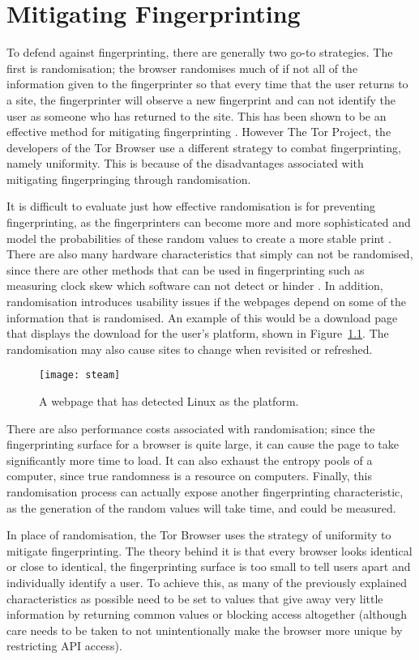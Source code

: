 \chapter{Mitigating Fingerprinting}

To defend against fingerprinting, there are generally two go-to strategies.
The first is randomisation; the browser randomises much of if not all of the information given to the fingerprinter so that every time that the user returns to a site, the fingerprinter will observe a new fingerprint and can not identify the user as someone who has returned to the site.
This has been shown to be an effective method for mitigating fingerprinting \citep{privaricator}.
However The Tor Project, the developers of the Tor Browser use a different strategy to combat fingerprinting, namely uniformity.
This is because of the disadvantages associated with mitigating fingerpringing through randomisation.

It is difficult to evaluate just how effective randomisation is for preventing fingerprinting, as the fingerprinters can become more and more sophisticated and model the probabilities of these random values to create a more stable print \citep{tor-project}.
There are also many hardware characteristics that simply can not be randomised, since there are other methods that can be used in fingerprinting such as measuring clock skew which software can not detect or hinder \citep{skew}.
In addition, randomisation introduces usability issues if the webpages depend on some of the information that is randomised.
An example of this would be a download page that displays the download for the user's platform, shown in Figure~\ref{fig:steam}.
The randomisation may also cause sites to change when revisited or refreshed.

\begin{figure}[h]
\texttt{[image: steam]}
\centering
\label{fig:steam}
\caption{A webpage that has detected Linux as the platform.}
\end{figure}

There are also performance costs associated with randomisation; since the fingerprinting surface for a browser is quite large, it can cause the page to take significantly more time to load.
It can also exhaust the entropy pools of a computer, since true randomness is a resource on computers.
Finally, this randomisation process can actually expose another fingerprinting characteristic, as the generation of the random values will take time, and could be measured.

In place of randomisation, the Tor Browser uses the strategy of uniformity to mitigate fingerprinting.
The theory behind it is that every browser looks identical or close to identical, the fingerprinting surface is too small to tell users apart and individually identify a user.
To achieve this, as many of the previously explained characteristics as possible need to be set to values that give away very little information by returning common values or blocking access altogether (although care needs to be taken to not unintentionally make the browser more unique by restricting API access).


